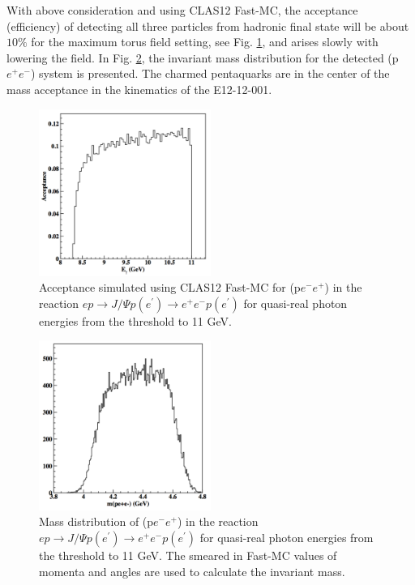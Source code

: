 \documentclass[12pt]{revtex4}
\begin{document}
With above consideration and using CLAS12 Fast-MC, the acceptance (efficiency) of detecting all three particles from hadronic final state will be about $10\%$ for the maximum torus field setting, see Fig. \ref{fig:accept}, and arises slowly with lowering the field. In Fig. \ref{fig:mpee}, the invariant mass distribution for the detected (p$e^+e^-$) system is presented. The charmed pentaquarks are in the center of the mass acceptance in the kinematics of the E12-12-001.  

\begin{figure}[htbp]
\begin{center}
\includegraphics[width=0.5\textwidth]{acceptance_u.pdf}
\caption{Acceptance simulated using CLAS12 Fast-MC for (p$e^-e^+$) in the reaction $e p\to J/\Psi p (e^\prime)\to e^+ e^- p (e^\prime)$ for quasi-real photon energies from the threshold to 11 GeV.}
\label{fig:accept}
\end{center}
\end{figure}

\begin{figure}[htbp]
\begin{center}
\includegraphics[width=0.5\textwidth]{m_pee.pdf}
\caption{Mass distribution of (p$e^-e^+$) in the reaction $e p\to J/\Psi p (e^\prime)\to e^+ e^- p (e^\prime)$ for quasi-real photon energies from the threshold to 11 GeV. The smeared in Fast-MC values of momenta and angles are used to calculate the invariant mass.}
\label{fig:mpee}
\end{center}
\end{figure}
\end{document}
